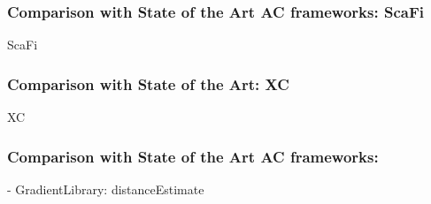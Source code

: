 %         

%         

\begin{frame}
    \frametitle{Comparison with State of the Art \ac{AC} frameworks: ScaFi}
    \begin{exampleblock}{ScaFi}
        
    \end{exampleblock}
\end{frame}

\begin{frame}
    \frametitle{Comparison with State of the Art: \ac{XC}}
    \begin{exampleblock}{\ac{XC}}
        
    \end{exampleblock}
\end{frame}

\begin{frame}
    \frametitle{Comparison with State of the Art \ac{AC} frameworks: \this}
    \begin{exampleblock}{\this - GradientLibrary: distanceEstimate}
        
    \end{exampleblock}
\end{frame}

